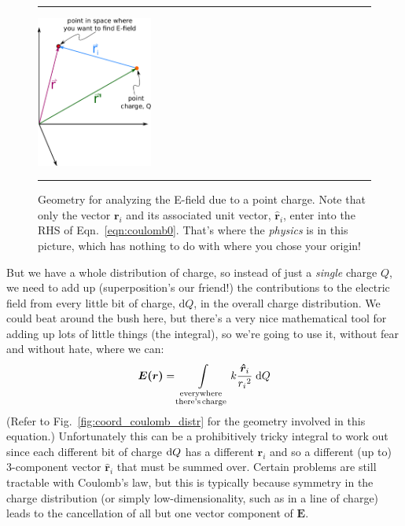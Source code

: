 \documentclass[10pt,letterpaper,twoside]{article}
\begin{document}
\begin{figure}[htb]
  \centering
  \vspace{5pt}
  \hrule%
  \vspace{10pt}
	\centering
	\includegraphics[keepaspectratio=true,width=1.50in]{./coordinate_system_single_charge.pdf}
    \caption{Geometry for analyzing the E-field due to a point charge.
			 Note that only the vector $\bm r_i$ and its associated unit vector, $\bm{\hat r}_i$, enter into the RHS of Eqn.~\ref{eqn:coulomb0}.
			 That's where the \textit{physics} is in this picture, which has nothing to do with where you chose your origin!}
    \label{fig:coord_coulomb}
  \hrule%
\vspace{5pt}
\end{figure}

But we have a whole distribution of charge, so instead of just a \textit{single} charge $Q$, we need to add up (superposition's our friend!) the contributions to the electric field from every little bit of charge, $\text{d}Q$, in the overall charge distribution.
We could beat around the bush here, but there's a very nice mathematical tool for adding up lots of little things (the integral), so we're going to use it, without fear and without hate, where we can:
\begin{equation}
\bm{E(r)} = \int\limits_{\substack{\text{everywhere}\\\text{there's\,charge}}} k\frac{\bm{\hat r}_i}{{r_i}^2}\;\mathrm{d}Q\label{eqn:coulomb1} \\
\end{equation}
(Refer to Fig.~\ref{fig:coord_coulomb_distr} for the geometry involved in this equation.)
Unfortunately this can be a prohibitively tricky integral to work out since each different bit of charge $\text d Q$ has a different $\bm r_i$ and so a different (up to) 3-component vector $\bm{\hat r}_i$ that must be summed over.
Certain problems are still tractable with Coulomb's law, but this is typically because symmetry in the charge distribution (or simply low-dimensionality, such as in a line of charge) leads to the cancellation of all but one vector component of $\bm E$.
\end{document}
